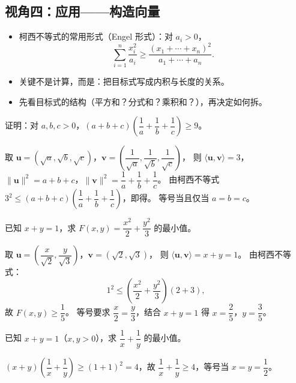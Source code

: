 \begin{explore}
\subsection{视角四：应用——构造向量}

\begin{itemize}
  \item 柯西不等式的常用形式（Engel 形式）：对 $a_i>0$，
  \[
    \sum_{i=1}^n\frac{x_i^2}{a_i}\geq\frac{(x_1+\cdots+x_n)^2}{a_1+\cdots+a_n}.
  \]
  \item 关键不是计算，而是：把目标式写成内积与长度的关系。
  \item 先看目标式的结构（平方和？分式和？乘积和？），再决定如何拆。
\end{itemize}

\begin{example}
证明：对 $a,b,c>0$，$(a+b+c)\left(\dfrac1a+\dfrac1b+\dfrac1c\right)\geq9$。
\end{example}
\begin{solution}
取 $\mathbf u=(\sqrt a,\sqrt b,\sqrt c)$，$\mathbf v=\left(\dfrac1{\sqrt a},\dfrac1{\sqrt b},\dfrac1{\sqrt c}\right)$，
则 $\langle\mathbf u,\mathbf v\rangle=3$，$\|\mathbf u\|^2=a+b+c$，$\|\mathbf v\|^2=\dfrac1a+\dfrac1b+\dfrac1c$。
由柯西不等式 $3^2\leq(a+b+c)\left(\dfrac1a+\dfrac1b+\dfrac1c\right)$，即得。
等号当且仅当 $a=b=c$。
\end{solution}

\begin{example}
已知 $x+y=1$，求 $F(x,y)=\dfrac{x^2}{2}+\dfrac{y^2}{3}$ 的最小值。
\end{example}
\begin{solution}
取 $\mathbf u=\left(\dfrac{x}{\sqrt2},\dfrac{y}{\sqrt3}\right)$，$\mathbf v=(\sqrt2,\sqrt3)$，
则 $\langle\mathbf u,\mathbf v\rangle=x+y=1$。
由柯西不等式：
\[
  1^2\leq\left(\frac{x^2}{2}+\frac{y^2}{3}\right)(2+3),
\]
故 $F(x,y)\geq\dfrac15$。
等号要求 $\dfrac{x}{2}=\dfrac{y}{3}$，结合 $x+y=1$ 得 $x=\dfrac25$，$y=\dfrac35$。
\end{solution}

\begin{problem}
已知 $x+y=1$（$x,y>0$），求 $\dfrac1x+\dfrac1y$ 的最小值。
\end{problem}
\begin{solution}
$(x+y)\left(\dfrac1x+\dfrac1y\right)\geq(1+1)^2=4$，故 $\dfrac1x+\dfrac1y\geq4$，等号当 $x=y=\dfrac12$。
\end{solution}


\end{explore}
